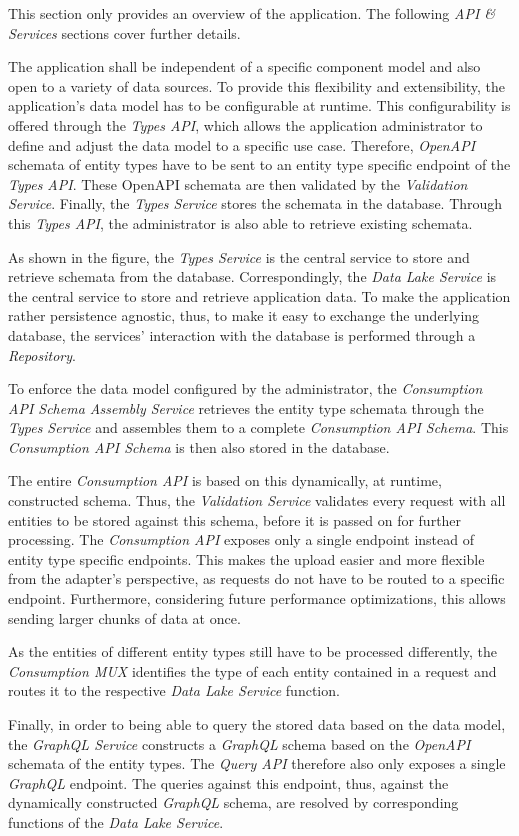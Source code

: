 This section only provides an overview of the application. The following \emph{API \& Services} sections cover further details.\par
The application shall be independent of a specific component model and also open to a variety of data sources. To provide this flexibility and extensibility, the application's data model has to be configurable at runtime. This configurability is offered through the \emph{Types API}, which allows the application administrator to define and adjust the data model to a specific use case. Therefore, \emph{OpenAPI} schemata of entity types have to be sent to an entity type specific endpoint of the \emph{Types API}. These OpenAPI schemata are then validated by the \emph{Validation Service}. Finally, the \emph{Types Service} stores the schemata in the database. Through this \emph{Types API}, the administrator is also able to retrieve existing schemata.\par
As shown in the figure, the \emph{Types Service} is the central service to store and retrieve schemata from the database. Correspondingly, the \emph{Data Lake Service} is the central service to store and retrieve application data. To make the application rather persistence agnostic, thus, to make it easy to exchange the underlying database, the services' interaction with the database is performed through a \emph{Repository}.\par 
To enforce the data model configured by the administrator, the \emph{Consumption API Schema Assembly Service} retrieves the entity type schemata through the \emph{Types Service} and assembles them to a complete \emph{Consumption API Schema}. This \emph{Consumption API Schema} is then also stored in the database.\par
The entire \emph{Consumption API} is based on this dynamically, at runtime, constructed schema. Thus, the \emph{Validation Service} validates every request with all entities to be stored against this schema, before it is passed on for further processing. The \emph{Consumption API} exposes only a single endpoint instead of entity type specific endpoints. This makes the upload easier and more flexible from the adapter's perspective, as requests do not have to be routed to a specific endpoint. Furthermore, considering future performance optimizations, this allows sending larger chunks of data at once.\par
As the entities of different entity types still have to be processed differently, the \emph{Consumption MUX} identifies the type of each entity contained in a request and routes it to the respective \emph{Data Lake Service} function.\par 
Finally, in order to being able to query the stored data based on the data model, the \emph{GraphQL Service} constructs a \emph{GraphQL} schema based on the \emph{OpenAPI} schemata of the entity types. The \emph{Query API} therefore also only exposes a single \emph{GraphQL} endpoint. The queries against this endpoint, thus, against the dynamically constructed \emph{GraphQL} schema, are resolved by corresponding functions of the \emph{Data Lake Service}.\\

